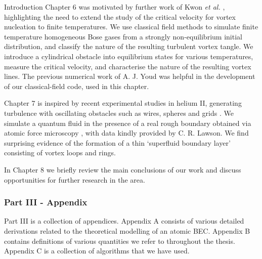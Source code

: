 \begin{chapter}{\label{cha:bose_gases}Introduction}
Chapter 6 was motivated by further work of Kwon {\it et al.} \cite{kwon_2015a}, highlighting the need to extend the study of the critical velocity for vortex nucleation to finite temperatures. We use classical field methods to simulate finite temperature homogeneous Bose gases from a strongly non-equilibrium initial distribution, and classify the nature of the resulting turbulent vortex tangle. We introduce a cylindrical obstacle into equilibrium states for various temperatures, measure the critical velocity, and characterise the nature of the resulting vortex lines. The previous numerical work of A. J. Youd was helpful in the development of our classical-field code, used in this chapter.

Chapter 7 is inspired by recent experimental studies in helium II, generating turbulence with oscillating obstacles such as wires, spheres and grids \cite{Davis2000,Guenault1986,Bradley2011,Fisher2001,Schoepe1995,Blaauwgeers2007,Bradley2012,Tabeling1998,Salort,VinenSkrbek2008}. We simulate a quantum fluid in the presence of a real rough boundary obtained via atomic force microscopy \cite{Lawson}, with data kindly provided by C. R. Lawson. We find surprising evidence of the formation of a thin `superfluid boundary layer' consisting of vortex loops and rings.

In Chapter 8 we briefly review the main conclusions of our work and discuss opportunities for further research in the area.

\subsubsection{Part III - Appendix}
Part III is a collection of appendices. Appendix A consists of various detailed derivations related to the theoretical modelling of an atomic BEC. Appendix B contains definitions of various quantities we refer to throughout the thesis. Appendix C is a collection of algorithms that we have used.



\end{chapter}
